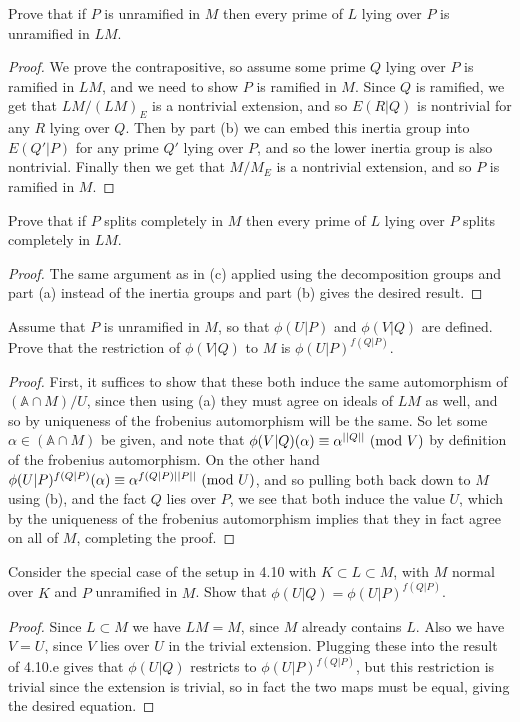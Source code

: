 \documentclass[11pt]{article}
\begin{document}
Prove that if $P$ is unramified in $M$ then every prime of $L$ lying over $P$ is unramified in $LM$.
\begin{proof}
  We prove the contrapositive, so assume some prime $Q$ lying over $P$ is ramified in $LM$, and we need to show $P$ is ramified in $M$.
  Since $Q$ is ramified, we get that $LM/(LM)_E$ is a nontrivial extension, and so $E(R|Q)$ is nontrivial for any $R$ lying over $Q$.
  Then by part (b) we can embed this inertia group into $E(Q'|P)$ for any prime $Q'$ lying over $P$, and so the lower inertia group is also nontrivial.
  Finally then we get that $M/M_E$ is a nontrivial extension, and so $P$ is ramified in $M$.
\end{proof}

Prove that if $P$ splits completely in $M$ then every prime of $L$ lying over $P$ splits completely in $LM$.
\begin{proof}
  The same argument as in (c) applied using the decomposition groups and part (a) instead of the inertia groups and part (b) gives the desired result.
\end{proof}

Assume that $P$ is unramified in $M$, so that $\phi(U|P)$ and $\phi(V|Q)$ are defined. Prove that the restriction of $\phi(V|Q)$ to $M$ is $\phi(U|P)^{f(Q|P)}$.
\begin{proof}
  First, it suffices to show that these both induce the same automorphism of $(\mathbb{A} \cap M)/U$, since then using (a) they must agree on ideals of $LM$ as well, and so by uniqueness of the frobenius automorphism will be the same.
  So let some $\alpha \in (\mathbb{A} \cap M)$ be given, and note that $\phi(V|Q)(\alpha) \equiv \alpha^{||Q||}\ (\text{mod}\ V)$ by definition of the frobenius automorphism.
  On the other hand $\phi(U|P)^{f(Q|P)}(\alpha) \equiv \alpha^{f(Q|P)||P||}\ (\text{mod}\ U)$, and so pulling both back down to $M$ using (b), and the fact $Q$ lies over $P$, we see that both induce the value $U$, which by the uniqueness of the frobenius automorphism implies that they in fact agree on all of $M$, completing the proof.
\end{proof}


Consider the special case of the setup in 4.10 with $K \subset L \subset M$, with $M$ normal over $K$ and $P$ unramified in $M$.
Show that $\phi(U|Q) = \phi(U|P)^{f(Q|P)}$.
\begin{proof}
  Since $L \subset M$ we have $LM = M$, since $M$ already contains $L$.
  Also we have $V = U$, since $V$ lies over $U$ in the trivial extension.
  Plugging these into the result of 4.10.e gives that $\phi(U|Q)$ restricts to $\phi(U|P)^{f(Q|P)}$, but this restriction is trivial since the extension is trivial, so in fact the two maps must be equal, giving the desired equation.
\end{proof}
\end{document}
